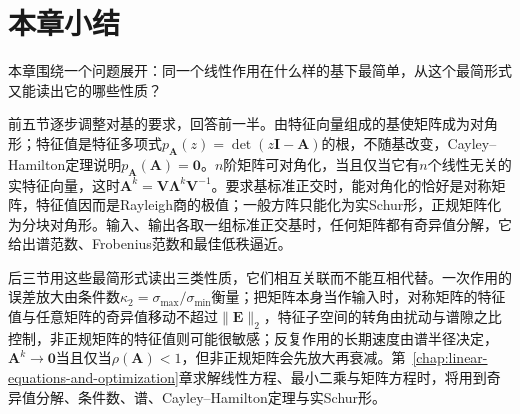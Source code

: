 
\section{本章小结}
\label{sec:ls-analysis-summary}
\label{sec:linear-algebra-summary}
\label{sec:matrix-analysis-summary}

本章围绕一个问题展开：同一个线性作用在什么样的基下最简单，从这个最简形式又能读出它的哪些性质？

前五节逐步调整对基的要求，回答前一半。由特征向量组成的基使矩阵成为对角形；特征值是特征多项式$p_{\bm A}(z)=\det(z\bm I-\bm A)$的根，不随基改变，Cayley--Hamilton定理说明$p_{\bm A}(\bm A)=\bm0$。$n$阶矩阵可对角化，当且仅当它有$n$个线性无关的实特征向量，这时$\bm A^k=\bm V\bm\Lambda^k\bm V^{-1}$。要求基标准正交时，能对角化的恰好是对称矩阵，特征值因而是Rayleigh商的极值；一般方阵只能化为实Schur形，正规矩阵化为分块对角形。输入、输出各取一组标准正交基时，任何矩阵都有奇异值分解，它给出谱范数、Frobenius范数和最佳低秩逼近。

后三节用这些最简形式读出三类性质，它们相互关联而不能互相代替。一次作用的误差放大由条件数$\kappa_2=\sigma_{\max}/\sigma_{\min}$衡量；把矩阵本身当作输入时，对称矩阵的特征值与任意矩阵的奇异值移动不超过$\lVert\bm E\rVert_2$，特征子空间的转角由扰动与谱隙之比控制，非正规矩阵的特征值则可能很敏感；反复作用的长期速度由谱半径决定，$\bm A^k\to\bm0$当且仅当$\rho(\bm A)<1$，但非正规矩阵会先放大再衰减。第~\ref{chap:linear-equations-and-optimization}章求解线性方程、最小二乘与矩阵方程时，将用到奇异值分解、条件数、谱、Cayley--Hamilton定理与实Schur形。
